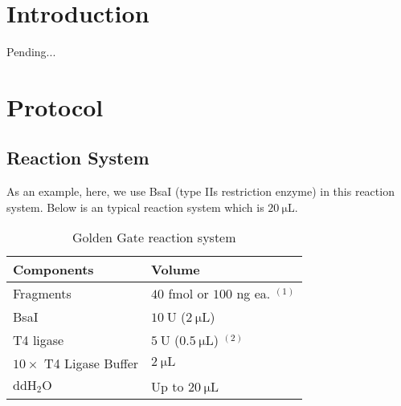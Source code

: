 \documentclass[a4paper, twocolumn]{article}
\begin{document}

\section{Introduction}
Pending...
\section{Protocol}
\subsection{Reaction System}
As an example, here, we use BsaI (type IIs restriction enzyme) in this reaction system. Below is an typical reaction system which is $20 \ \mathrm{\mu L}$.
\begin{table}[H]
    \centering
    \begin{tabular}{lp{3cm}}
        \toprule[1.5pt]
        Components & Volume \\
        \midrule 
        Fragments  & $40$ fmol or $100$ ng ea. $^{(1)}$\\
        BsaI & $10 \ \mathrm{U}$ ($2 \ \mathrm{\mu L}$)\\
        T4 ligase & $5 \ \mathrm{U}$ ($0.5\ \mathrm{\mu L}$) $^{(2)}$\\
        $10 \times$ T4 Ligase Buffer &  $2 \ \mathrm{\mu L}$ \\
        $\mathrm{ddH_2O}$ & Up to $20 \ \mathrm{\mu L}$  \\
        \bottomrule[1.5pt]
    \end{tabular}
    \caption{Golden Gate reaction system}
\end{table}
\end{document}

